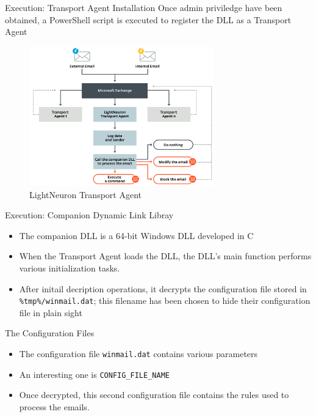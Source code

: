 \begin{frame}[fragile]{Execution: Transport Agent Installation}
    Once admin priviledge have been obtained, a PowerShell script is executed to 
    register the DLL as a Transport Agent
    \begin{figure}
        \includegraphics[width=8cm]{figures/transport_agent.PNG}
        \caption{LightNeuron Transport Agent}
    \end{figure}
\end{frame}

\begin{frame}[fragile]{Execution: Companion Dynamic Link Libray}
    \begin{itemize}
        \item The companion DLL is a 64-bit Windows DLL developed in C
        \item When the Transport Agent loads the DLL, 
        the DLL’s main function performs various initialization tasks.
        \item After initail decription operations, it decrypts 
        the configuration file stored in \texttt{\%tmp\%/winmail.dat}; 
        this filename has been chosen to hide their configuration file in plain sight
    \end{itemize}
\end{frame}

\begin{frame}[fragile]{The Configuration Files}
    \begin{itemize}
        \item The configuration file \texttt{winmail.dat} contains various parameters
        \item An interesting one is \texttt{CONFIG\_FILE\_NAME}
        \item Once decrypted, this second configuration file contains the rules used to process the emails.
    \end{itemize}
\end{frame}

